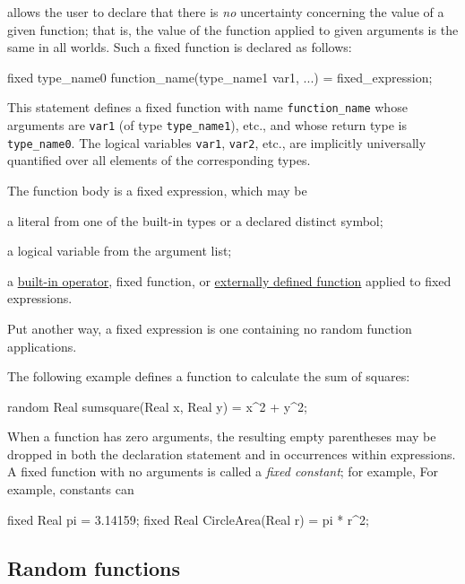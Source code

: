 \documentclass[12pt]{article}
\begin{document}
\bl allows the user to declare that there is {\em no} uncertainty concerning the value of a given function; that is, the
value of the function applied to given arguments is the same in all worlds. Such a fixed function is declared as follows:
\begin{blogcode}
fixed type_name0 function_name(type_name1 var1, ...) = 
  fixed_expression;
\end{blogcode}
This statement defines a fixed function with name \texttt{function\_name} whose arguments are {\tt var1} (of type \verb|type_name1|), etc.,
and whose return type is \verb|type_name0|. The logical variables {\tt var1}, {\tt var2}, etc., are implicitly universally quantified over
all elements of the corresponding types.

The function body is a fixed expression, which may be
\begin{itemize*}
\item a literal from one of the built-in types or a declared distinct symbol;
\item a logical variable from the argument list;
\item a \hyperref[builtin-operator-appendix]{built-in operator}, fixed function, or \hyperref[external-function-appendix]{externally defined function} applied to fixed expressions.
\end{itemize*}
Put another way, a fixed expression is one containing no random function applications.

The following example defines a function to calculate the sum of squares:
\begin{blogcode}
random Real sumsquare(Real x, Real y) = x^2 + y^2;
\end{blogcode}

When a function has zero arguments, the resulting empty parentheses may be dropped
in both the declaration statement and in occurrences within expressions.
A fixed function with no arguments is called a \emph{fixed constant}; for example,
For example, constants can 
\begin{blogcode}
fixed Real pi = 3.14159;
fixed Real CircleArea(Real r) = pi * r^2;
\end{blogcode}



\subsection{Random functions}\label{random-function-section}
\end{document}
